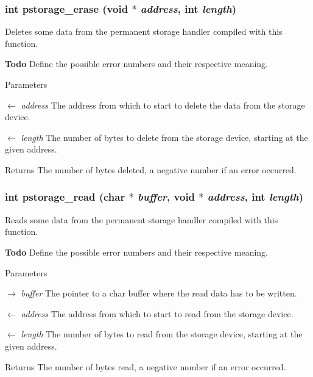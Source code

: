 \subsubsection[{pstorage\_\-erase}]{\setlength{\rightskip}{0pt plus 5cm}int pstorage\_\-erase (void $\ast$ {\em address}, \/  int {\em length})}\label{de/de8/persistent_8h_a8e482bb6a9f9c962141bd09628fb621e}
Deletes some data from the permanent storage handler compiled with this function.

\begin{Desc}
\item[{\bf Todo}]Define the possible error numbers and their respective meaning.\end{Desc}

\begin{DoxyParams}{Parameters}
\item[\mbox{$\leftarrow$} {\em address}]The address from which to start to delete the data from the storage device. \item[\mbox{$\leftarrow$} {\em length}]The number of bytes to delete from the storage device, starting at the given address.\end{DoxyParams}
\begin{DoxyReturn}{Returns}
The number of bytes deleted, a negative number if an error occurred. 
\end{DoxyReturn}
\subsubsection[{pstorage\_\-read}]{\setlength{\rightskip}{0pt plus 5cm}int pstorage\_\-read (char $\ast$ {\em buffer}, \/  void $\ast$ {\em address}, \/  int {\em length})}\label{de/de8/persistent_8h_a04909bd2b94fc99ff1b2362a222b02df}
Reads some data from the permanent storage handler compiled with this function.

\begin{Desc}
\item[{\bf Todo}]Define the possible error numbers and their respective meaning.\end{Desc}

\begin{DoxyParams}{Parameters}
\item[\mbox{$\rightarrow$} {\em buffer}]The pointer to a char buffer where the read data has to be written. \item[\mbox{$\leftarrow$} {\em address}]The address from which to start to read from the storage device. \item[\mbox{$\leftarrow$} {\em length}]The number of bytes to read from the storage device, starting at the given address.\end{DoxyParams}
\begin{DoxyReturn}{Returns}
The number of bytes read, a negative number if an error occurred. 
\end{DoxyReturn}
